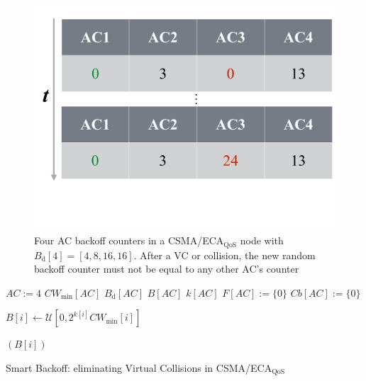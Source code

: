 

	\begin{figure}[tb]
	\centering
		\includegraphics[width=0.8\linewidth]{figures/smartBackoff1.pdf}
		\caption{Four AC backoff counters in a CSMA/ECA$_{\text{QoS}}$ node with $B_{\text{d}}[4]=[4,8,16,16]$. After a VC or collision, the new random backoff counter must not be equal to any other AC's counter}
		\label{fig:smartBackoff1}
	\end{figure}
	


	\begin{algorithm}[ht!!!]
		$AC:=4$
		$CW_{\min}[AC]$
		$B_{\text{d}}[AC]$
		$B[AC]$
		$k[AC]$
		$F[AC]:=\{0\}$\;
		$Cb[AC]:=\{0\}$\;
		\tcp{}\tcp{}
		{
			$B[i]\gets\mathcal{U}[0,2^{k[i]}{CW_{\min}[i]}]$\;
			{
			}
			
			
		}
		\Return $(B[i])$\;
		\vspace{0.2cm}
		\caption{Smart Backoff: eliminating Virtual Collisions in CSMA/ECA$_{\text{QoS}}$}
		\label{alg:smartBackoff}
	\end{algorithm}

